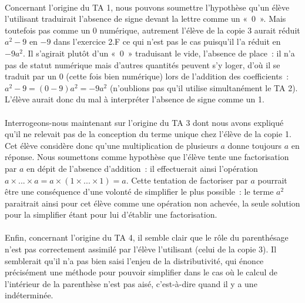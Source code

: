 \documentclass{report}
\theoremstyle{definition}
\newcommand{\cad}{c'est-à-dire } %
\begin{document}
\paragraph*{}

Concernant l'origine du TA 1, nous pouvons soumettre l'hypothèse qu'un élève l'utilisant traduirait l'absence de signe devant la lettre comme un «~0~». Mais toutefois pas comme un 0 numérique, autrement l'élève de la copie 3 aurait réduit $a^2-9$ en $-9$ dans l'exercice 2.F ce qui n'est pas le cas puisqu'il l'a réduit en $-9a^2$. Il s'agirait plutôt d'un «~0~» traduisant le vide, l'absence de place~: il n'a pas de statut numérique mais d'autres quantités peuvent s'y loger, d'où il se traduit par un 0 (cette fois bien numérique) lors de l'addition des coefficients~: $a^2-9=(0-9)a^2=-9a^2$ (n'oublions pas qu'il utilise simultanément le TA 2). L'élève aurait donc du mal à interpréter l'absence de signe comme un 1.

\paragraph*{}

Interrogeons-nous maintenant sur l'origine du TA 3 dont nous avons expliqué qu'il ne relevait pas de la conception du terme unique chez l'élève de la copie 1. Cet élève considère donc qu'une multiplication de plusieurs $a$ donne toujours $a$ en réponse. Nous soumettons comme hypothèse que l'élève tente une factorisation par $a$ en dépit de l'absence d'addition~: il effectuerait ainsi l'opération $a\times...\times a=a\times(1\times...\times 1)=a$. Cette tentation de factoriser par $a$ pourrait être une conséquence d'une volonté de simplifier le plus possible~: le terme $a^2$ paraitrait ainsi pour cet élève comme une opération non achevée, la seule solution pour la simplifier étant pour lui d'établir une factorisation.

\paragraph*{}

Enfin, concernant l'origine du TA 4, il semble clair que le rôle du parenthésage n'est pas correctement assimilé par l'élève l'utilisant (celui de la copie 3). Il semblerait qu'il n'a pas bien saisi l'enjeu de la distributivité, qui énonce précisément une méthode pour pouvoir simplifier dans le cas où le calcul de l'intérieur de la parenthèse n'est pas aisé, \cad quand il y a une indéterminée.
\end{document}
